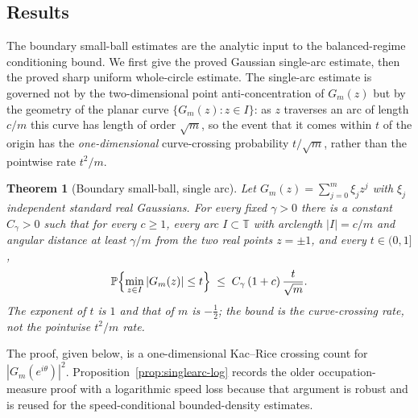 \documentclass[11pt]{amsart}
\numberwithin{equation}{section}
\newtheorem{theorem}{Theorem}[section]
\theoremstyle{definition}
\theoremstyle{remark}
\newcommand{\T}{\mathbb T}
\newcommand{\Prob}{\mathbb P}
\newcommand{\abs}[1]{\left\lvert #1\right\rvert}
\begin{document}
\subsection{Results}\label{sub:results}

The boundary small-ball estimates are the analytic input to the balanced-regime conditioning bound. We first give the proved Gaussian single-arc estimate, then the proved sharp uniform whole-circle estimate. The single-arc estimate is governed not by the two-dimensional point anti-concentration of $G_m(z)$ but by the geometry of the planar curve $\{G_m(z):z\in I\}$: as $z$ traverses an arc of length $c/m$ this curve has length of order $\sqrt m$, so the event that it comes within $t$ of the origin has the \emph{one-dimensional} curve-crossing probability \(t/\sqrt m\), rather than the pointwise rate \(t^2/m\).

\begin{theorem}[Boundary small-ball, single arc]\label{thm:singlearc}
Let $G_m(z)=\sum_{j=0}^m\xi_jz^j$ with $\xi_j$ independent standard real Gaussians. For every fixed $\gamma>0$ there is a constant $C_\gamma>0$ such that for every $c\ge1$, every arc $I\subset\T$ with arclength $\abs I=c/m$ and angular distance at least $\gamma/m$ from the two real points $z=\pm1$, and every $t\in(0,1]$,
\begin{equation}\label{eq:singlearc}
  \Prob\Bigl\{\min_{z\in I}\abs{G_m(z)}\le t\Bigr\}\;\le\;C_\gamma\,(1+c)\,\frac{t}{\sqrt m}.
\end{equation}
The exponent of $t$ is $1$ and that of $m$ is $-\tfrac12$; the bound is the curve-crossing rate, not the pointwise $t^2/m$ rate.
\end{theorem}

The proof, given below, is a one-dimensional Kac--Rice crossing count for
\(|G_m(e^{i\theta})|^2\).  Proposition~\ref{prop:singlearc-log} records the
older occupation-measure proof with a logarithmic speed loss because that
argument is robust and is reused for the speed-conditional bounded-density
estimates.
\end{document}
